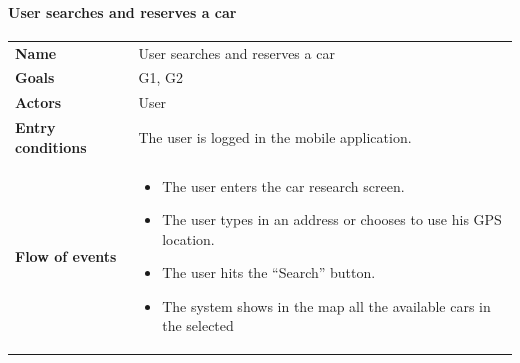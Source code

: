 \documentclass[]{article}
\providecommand{\tightlist}{%
  \setlength{\itemsep}{0pt}\setlength{\parskip}{0pt}}
\let\oldparagraph\paragraph
\renewcommand{\paragraph}[1]{\oldparagraph{#1}\mbox{}}
\begin{document}
\newpage

\paragraph{User searches and reserves a
car}\label{user-searches-and-reserves-a-car}

\begin{longtable}[]{@{}ll@{}}
\toprule
\begin{minipage}[t]{0.29\columnwidth}\raggedright\strut
\textbf{Name}\strut
\end{minipage} & \begin{minipage}[t]{0.65\columnwidth}\raggedright\strut
User searches and reserves a car\strut
\end{minipage}\tabularnewline
\begin{minipage}[t]{0.29\columnwidth}\raggedright\strut
\textbf{Goals}\strut
\end{minipage} & \begin{minipage}[t]{0.65\columnwidth}\raggedright\strut
G1, G2\strut
\end{minipage}\tabularnewline
\begin{minipage}[t]{0.29\columnwidth}\raggedright\strut
\textbf{Actors}\strut
\end{minipage} & \begin{minipage}[t]{0.65\columnwidth}\raggedright\strut
User\strut
\end{minipage}\tabularnewline
\begin{minipage}[t]{0.29\columnwidth}\raggedright\strut
\textbf{Entry conditions}\strut
\end{minipage} & \begin{minipage}[t]{0.65\columnwidth}\raggedright\strut
The user is logged in the mobile application.\strut
\end{minipage}\tabularnewline
\begin{minipage}[t]{0.29\columnwidth}\raggedright\strut
\textbf{Flow of events}\strut
\end{minipage} & \begin{minipage}[t]{0.65\columnwidth}\raggedright\strut
\begin{itemize}
\tightlist
\item
  The user enters the car research screen.
\item
  The user types in an address or chooses to use his GPS location.
\item
  The user hits the ``Search'' button.
\item
  The system shows in the map all the available cars in the selected

\end{itemize}
\end{minipage}
\end{longtable}
\end{document}
